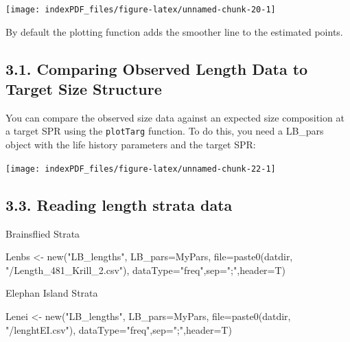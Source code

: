 \documentclass[
]{article}
\newenvironment{Shaded}{\begin{snugshade}}{\end{snugshade}}
\newcommand{\AttributeTok}[1]{\textcolor[rgb]{0.77,0.63,0.00}{#1}}
\newcommand{\FunctionTok}[1]{\textcolor[rgb]{0.00,0.00,0.00}{#1}}
\newcommand{\NormalTok}[1]{#1}
\newcommand{\OtherTok}[1]{\textcolor[rgb]{0.56,0.35,0.01}{#1}}
\newcommand{\StringTok}[1]{\textcolor[rgb]{0.31,0.60,0.02}{#1}}
\begin{document}
\begin{center}\texttt{[image: indexPDF\_files/figure-latex/unnamed-chunk-20-1]} \end{center}

By default the plotting function adds the smoother line to the estimated
points.

\newpage

\hypertarget{comparing-observed-length-data-to-target-size-structure}{%
\subsection{3.1. Comparing Observed Length Data to Target Size
Structure}\label{comparing-observed-length-data-to-target-size-structure}}

You can compare the observed size data against an expected size
composition at a target SPR using the \texttt{plotTarg} function. To do
this, you need a LB\_pars object with the life history parameters and
the target SPR:

\begin{center}\texttt{[image: indexPDF\_files/figure-latex/unnamed-chunk-22-1]} \end{center}

\newpage

\hypertarget{reading-length-strata-data}{%
\subsection{3.3. Reading length strata
data}\label{reading-length-strata-data}}

Brainsflied Strata

\begin{Shaded}
\begin{Highlighting}[]
\NormalTok{Lenbs }\OtherTok{\textless{}{-}} \FunctionTok{new}\NormalTok{(}\StringTok{"LB\_lengths"}\NormalTok{, }\AttributeTok{LB\_pars=}\NormalTok{MyPars, }\AttributeTok{file=}\FunctionTok{paste0}\NormalTok{(datdir, }\StringTok{"/Length\_481\_Krill\_2.csv"}\NormalTok{), }\AttributeTok{dataType=}\StringTok{"freq"}\NormalTok{,}\AttributeTok{sep=}\StringTok{";"}\NormalTok{,}\AttributeTok{header=}\NormalTok{T)}
\end{Highlighting}
\end{Shaded}

Elephan Island Strata

\begin{Shaded}
\begin{Highlighting}[]
\NormalTok{Lenei }\OtherTok{\textless{}{-}} \FunctionTok{new}\NormalTok{(}\StringTok{"LB\_lengths"}\NormalTok{, }\AttributeTok{LB\_pars=}\NormalTok{MyPars, }\AttributeTok{file=}\FunctionTok{paste0}\NormalTok{(datdir, }\StringTok{"/lenghtEI.csv"}\NormalTok{), }\AttributeTok{dataType=}\StringTok{"freq"}\NormalTok{,}\AttributeTok{sep=}\StringTok{";"}\NormalTok{,}\AttributeTok{header=}\NormalTok{T)}
\end{Highlighting}
\end{Shaded}
\end{document}
